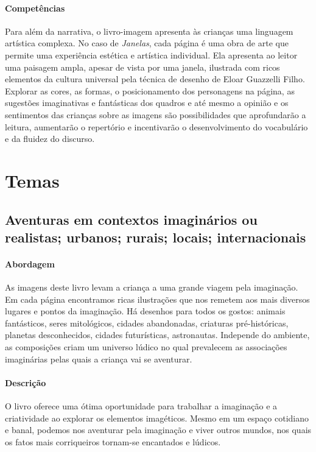 \documentclass[11pt]{extarticle}
\begin{document}
\paragraph{Competências} 
Para além da narrativa, o livro-imagem 
apresenta às crianças uma linguagem artística complexa. No caso de 
\textit{Janelas}, cada página é uma obra de arte que permite 
uma experiência estética e artística individual. Ela apresenta ao leitor 
uma paisagem ampla, apesar de vista por uma janela, ilustrada com ricos elementos da cultura universal pela técnica de desenho de 
Eloar Guazzelli Filho. Explorar as cores, as formas, o posicionamento dos personagens 
na página, as sugestões imaginativas e fantásticas dos quadros e até mesmo a opinião e os sentimentos das crianças sobre as imagens 
são possibilidades que aprofundarão a leitura, aumentarão o repertório 
e incentivarão o desenvolvimento do vocabulário e da fluidez do discurso. 



\section{Temas}

\subsection{Aventuras em contextos imaginários ou realistas; urbanos; rurais; locais; internacionais}

\paragraph{Abordagem} As imagens deste livro levam a criança a uma grande viagem pela imaginação. Em cada página encontramos ricas ilustrações que nos remetem aos mais diversos lugares e pontos da imaginação. Há desenhos para todos os gostos: animais fantásticos, seres mitológicos, cidades abandonadas, criaturas pré-históricas, planetas desconhecidos, cidades futurísticas, astronautas. Independe do ambiente, as composições criam um universo lúdico no qual prevalecem as associações imaginárias pelas quais a criança vai se aventurar.

\paragraph{Descrição} O livro oferece uma ótima oportunidade para trabalhar a imaginação e a criatividade ao explorar os elementos imagéticos. Mesmo em um espaço cotidiano e banal, podemos nos aventurar pela imaginação e viver outros mundos, nos quais os fatos mais corriqueiros tornam-se encantados e lúdicos.
\end{document}
